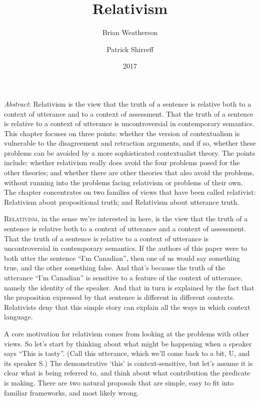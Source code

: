 \documentclass[
  11pt,
  letterpaper,
  DIV=11,
  numbers=noendperiod,
  twoside]{scrartcl}
\title{Relativism}
\author{Brian Weatherson \and Patrick Shirreff}
\date{2017}
\renewenvironment{abstract}
 {\vspace{-1.25cm}
 \quotation\small\noindent\emph{Abstract}:}
 {\endquotation}
\renewenvironment{abstract}
 {\quotation\small\noindent\emph{Abstract}:}
 {\endquotation\vspace{-0.02cm}}
\begin{document}
\maketitle
\begin{abstract}
Relativism is the view that the truth of a sentence is relative both to
a context of utterance and to a context of assessment. That the truth of
a sentence is relative to a context of utterance is uncontroversial in
contemporary semantics. This chapter focuses on three points: whether
the version of contextualism is vulnerable to the disagreement and
retraction arguments, and if so, whether these problems can be avoided
by a more sophisticated contextualist theory. The points include:
whether relativism really does avoid the four problems posed for the
other theories; and whether there are other theories that also avoid the
problems, without running into the problems facing relativism or
problems of their own. The chapter concentrates on two families of views
that have been called relativist: Relativism about propositional truth;
and Relativism about utterance truth.
\end{abstract}


\lettrine{R}{elativism}, in the sense we're interested in here, is the
view that the truth of a sentence is relative both to a context of
utterance and a context of assessment. That the truth of a sentence is
relative to a context of utterance is uncontroversial in contemporary
semantics. If the authors of this paper were to both utter the sentence
``I'm Canadian'', then one of us would say something true, and the other
something false. And that's because the truth of the utterance ``I'm
Canadian'' is sensitive to a feature of the context of utterance, namely
the identity of the speaker. And that in turn is explained by the fact
that the proposition expressed by that sentence is different in
different contexts. Relativists deny that this simple story can explain
all the ways in which context language.

A core motivation for relativism comes from looking at the problems with
other views. So let's start by thinking about what might be happening
when a speaker says ``This is tasty''. (Call this utterance, which we'll
come back to a bit, U, and its speaker S.) The demonstrative `this' is
context-sensitive, but let's assume it is clear what is being referred
to, and think about what contribution the predicate is making. There are
two natural proposals that are simple, easy to fit into familiar
frameworks, and most likely wrong.
\end{document}
